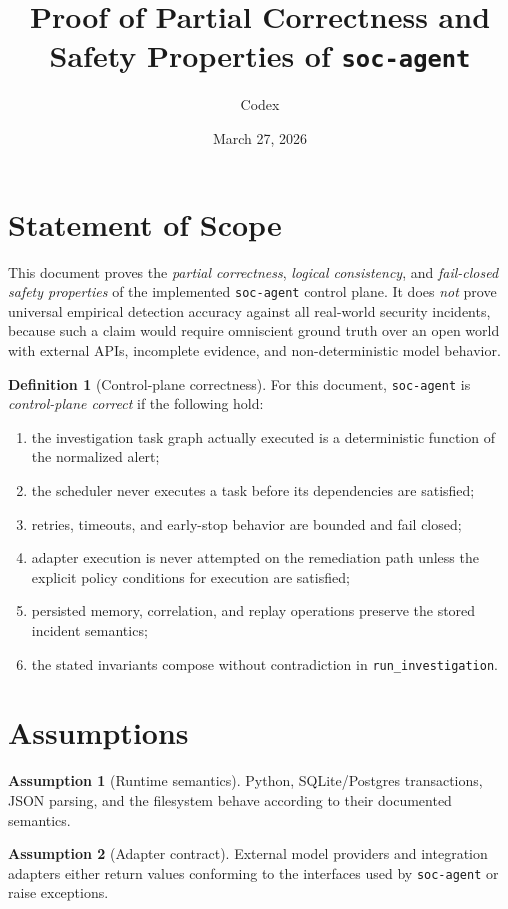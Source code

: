 \documentclass[11pt]{article}
\title{Proof of Partial Correctness and Safety Properties of \texttt{soc-agent}}
\author{Codex}
\date{March 27, 2026}
\theoremstyle{definition}
\newtheorem{definition}{Definition}
\newtheorem{assumption}{Assumption}
\begin{document}
\maketitle

\section{Statement of Scope}
This document proves the \emph{partial correctness}, \emph{logical consistency}, and
\emph{fail-closed safety properties} of the implemented \texttt{soc-agent} control plane.
It does \emph{not} prove universal empirical detection accuracy against all real-world
security incidents, because such a claim would require omniscient ground truth over an
open world with external APIs, incomplete evidence, and non-deterministic model behavior.

\begin{definition}[Control-plane correctness]
For this document, \texttt{soc-agent} is \emph{control-plane correct} if the following hold:
\begin{enumerate}[label=(\arabic*)]
\item the investigation task graph actually executed is a deterministic function of the normalized alert;
\item the scheduler never executes a task before its dependencies are satisfied;
\item retries, timeouts, and early-stop behavior are bounded and fail closed;
\item adapter execution is never attempted on the remediation path unless the explicit policy conditions for execution are satisfied;
\item persisted memory, correlation, and replay operations preserve the stored incident semantics;
\item the stated invariants compose without contradiction in \texttt{run\_investigation}.
\end{enumerate}
\end{definition}

\section{Assumptions}
\begin{assumption}[Runtime semantics]
Python, SQLite/Postgres transactions, JSON parsing, and the filesystem behave according to
their documented semantics.
\end{assumption}

\begin{assumption}[Adapter contract]
External model providers and integration adapters either return values conforming to the
interfaces used by \texttt{soc-agent} or raise exceptions.
\end{assumption}
\end{document}

